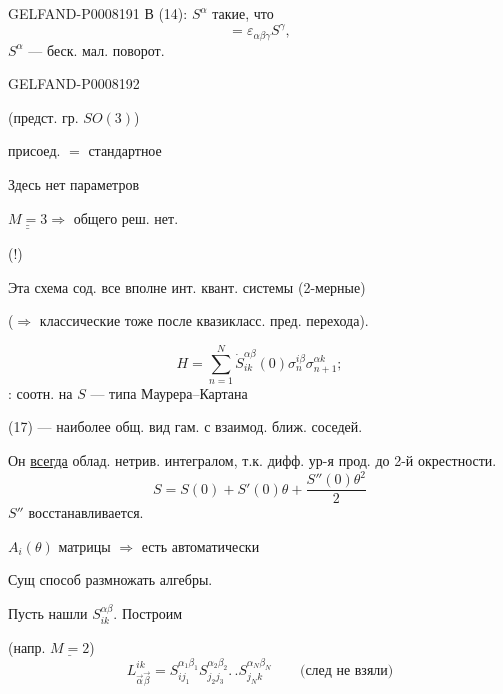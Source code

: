 \begin{GelfandAdjacentEvidence}{GELFAND-P000819}{1}
В (14): \(S^\alpha\) такие, что
\begin{equation*}
[S^\alpha,S^\beta]=\varepsilon_{\alpha\beta\gamma}S^\gamma,\tag{16}
\end{equation*}
\(S^\alpha\) — беск. мал. поворот.
\end{GelfandAdjacentEvidence}
\begin{GelfandAdjacentEvidence}{GELFAND-P000819}{2}


(предст. гр. \(SO(3)\))

присоед. \(=\) стандартное

Здесь нет параметров

\(\underline{\underline{M=3}}\Rightarrow\) общего реш. нет.

(!) 

Эта схема сод. все вполне инт. квант. системы (2-мерные)

(\(\Rightarrow\) классические тоже после квазикласс. пред. перехода).

\begin{equation*}
H=\sum_{n=1}^{N}\dot S_{ik}^{\alpha\beta}(0)
 \sigma_n^{i\beta}\sigma_{n+1}^{\alpha k};\tag{17}
\end{equation*}
: соотн. на \(S\) — типа Маурера–Картана

(17) — наиболее общ. вид гам. с взаимод. ближ. соседей.

Он \uline{всегда} облад. нетрив. интегралом, т.к. дифф. ур-я прод. до 2-й окрестности.
\[
S=S(0)+S'(0)\theta+\frac{S''(0)\theta^2}{2}
\]
\(S''\) восстанавливается.

\(A_i(\theta)\) матрицы \(\Rightarrow\) есть  автоматически

Сущ способ размножать алгебры.

Пусть нашли \(S_{ik}^{\alpha\beta}\). Построим

(напр. \(\underline{M=2}\))
\begin{equation*}
 L^{ik}_{\vec\alpha\vec\beta}
 =S_{ij_1}^{\alpha_1\beta_1}S_{j_2j_3}^{\alpha_2\beta_2}.\, .
 S_{j_Nk}^{\alpha_N\beta_N}
 \qquad\text{(след не взяли)}\tag{18}
\end{equation*}
\end{GelfandAdjacentEvidence}
